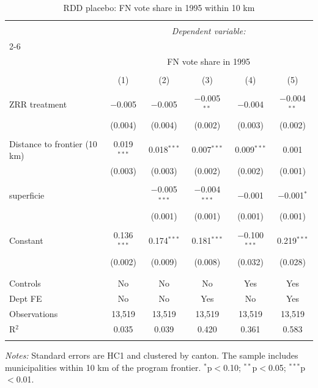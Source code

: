 
\begin{table}[H] \centering
  \caption{RDD placebo: FN vote share in 1995 within 10 km}
  \label{tab:rdd_results_main_1995}
\begin{tabular}{@{\extracolsep{2pt}}lccccc}
\\[-1.8ex]\hline
\hline \\[-1.8ex]
 & \multicolumn{5}{c}{\textit{Dependent variable:}} \\
\cline{2-6}
\\[-1.8ex] & \multicolumn{5}{c}{FN vote share in 1995} \\
\\[-1.8ex] & (1) & (2) & (3) & (4) & (5)\\
\hline \\[-1.8ex]
 ZRR treatment & $-$0.005 & $-$0.005 & $-$0.005$^{**}$ & $-$0.004 & $-$0.004$^{**}$ \\
  & (0.004) & (0.004) & (0.002) & (0.003) & (0.002) \\
  & & & & & \\
 Distance to frontier (10 km) & 0.019$^{***}$ & 0.018$^{***}$ & 0.007$^{***}$ & 0.009$^{***}$ & 0.001 \\
  & (0.003) & (0.003) & (0.002) & (0.002) & (0.001) \\
  & & & & & \\
 superficie &  & $-$0.005$^{***}$ & $-$0.004$^{***}$ & $-$0.001 & $-$0.001$^{*}$ \\
  &  & (0.001) & (0.001) & (0.001) & (0.001) \\
  & & & & & \\
 Constant & 0.136$^{***}$ & 0.174$^{***}$ & 0.181$^{***}$ & $-$0.100$^{***}$ & 0.219$^{***}$ \\
  & (0.002) & (0.009) & (0.008) & (0.032) & (0.028) \\
  & & & & & \\
\hline \\[-1.8ex]
Controls & No & No & No & Yes & Yes \\
Dept FE & No & No & Yes & No & Yes \\
Observations & 13,519 & 13,519 & 13,519 & 13,519 & 13,519 \\
R$^{2}$ & 0.035 & 0.039 & 0.420 & 0.361 & 0.583 \\
\hline
\hline \\[-1.8ex]
\end{tabular}
\par\noindent\parbox{\textwidth}{\scriptsize \textit{Notes:} Standard errors are HC1 and clustered by canton. The sample includes municipalities within 10 km of the program frontier. $^{*}$p$<$0.10; $^{**}$p$<$0.05; $^{***}$p$<$0.01.}
\end{table}
